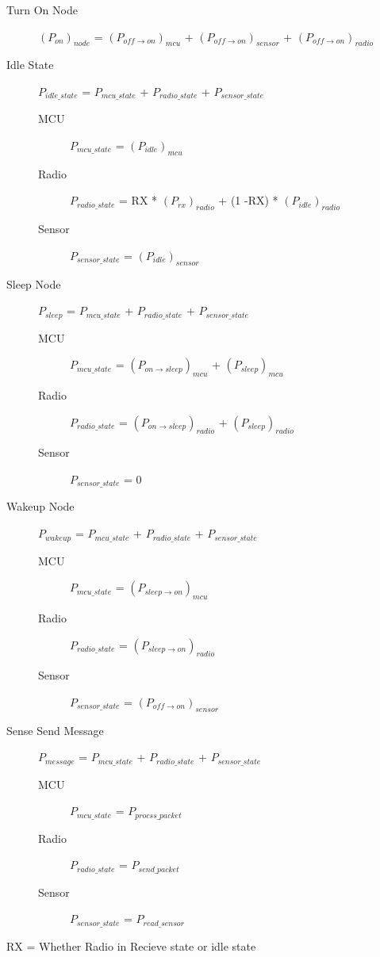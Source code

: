 \documentclass{article}
\begin{document}
\begin{description}
	
	\item[Turn On Node] $(P_{on})_{node}$ = $(P_{off \to on})_{mcu}$ + $(P_{off \to on})_{sensor}$ + $(P_{off \to on})_{radio}$ 
	\item[Idle State] $P_{idle\_state}$ = $P_{mcu\_state}$ + $P_{radio\_state}$ + $P_{sensor\_state}$ \\
		\begin{description}
			\item[MCU] $P_{mcu\_state}$ = $(P_{idle})_{mcu} $
			\item[Radio] $P_{radio\_state}$ = RX * $(P_{rx})_{radio}$ + (1 -RX) * $(P_{idle})_{radio}$
			\item[Sensor] $P_{sensor\_state}$ = $(P_{idle})_{sensor} $
		\end{description}
	\item[Sleep Node] $P_{sleep}$ = $P_{mcu\_state}$ + $P_{radio\_state}$ + $P_{sensor\_state}$ \\
		\begin{description}
			\item[MCU] $P_{mcu\_state}$ = $(P_{on \to sleep})_{mcu}$ + $(P_{sleep})_{mcu}$
			\item[Radio] $P_{radio\_state}$ = $(P_{on \to sleep})_{radio}$ + $(P_{sleep})_{radio}$
			\item[Sensor] $P_{sensor\_state}$ = 0
		\end{description}
	\item[Wakeup Node] $P_{wakeup}$ = $P_{mcu\_state}$ + $P_{radio\_state}$ + $P_{sensor\_state}$ \\
		\begin{description}
			\item[MCU] $P_{mcu\_state}$ = $(P_{sleep \to on})_{mcu}$
			\item[Radio] $P_{radio\_state}$ = $(P_{sleep \to on})_{radio}$
			\item[Sensor] $P_{sensor\_state}$ = $(P_{off \to on})_{sensor}$
		\end{description}
	\item[Sense Send Message] $P_{message}$ = $P_{mcu\_state}$ + $P_{radio\_state}$ + $P_{sensor\_state}$ \\
		\begin{description}
			\item[MCU] $P_{mcu\_state}$ = $P_{procss\_packet}$
			\item[Radio] $P_{radio\_state}$ = $P_{send\_packet}$
			\item[Sensor] $P_{sensor\_state}$ = $P_{read\_sensor}$
		\end{description}
\end{description}

RX = Whether Radio in Recieve state or idle state
\end{document}
